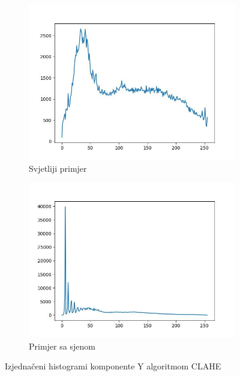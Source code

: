 \documentclass[times, utf8, diplomski]{fer}
\begin{document}
\begin{figure}[H]
\begin{subfigure}[b]{0.4\textwidth}
         \includegraphics[width=\textwidth]{figures/ce_examples/3/hist_clahe.jpg}
         \caption{Svjetliji primjer}
     \end{subfigure}
     \begin{subfigure}[b]{0.4\textwidth}
         \centering
         \includegraphics[width=\textwidth]{figures/ce_examples/4/hist_clahe.jpg}
         \caption{Primjer sa sjenom}
     \end{subfigure}
        \caption{Izjednačeni histogrami komponente Y algoritmom CLAHE}
        \label{fig:ce_hist_clahe}
\end{figure}
\end{document}
